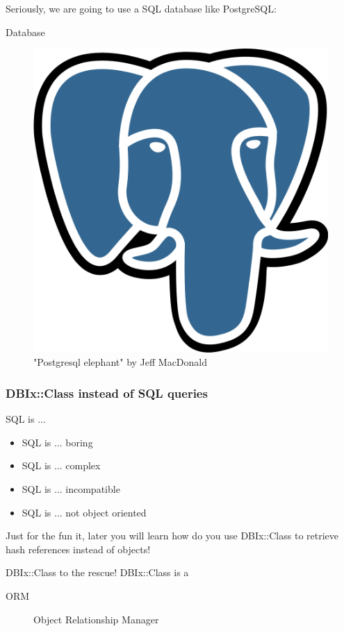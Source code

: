 Seriously, we are going to use a SQL database like
PostgreSQL:

\begin{frame}{Database}
\begin{figure}[!ht]
\centering
\includegraphics[width=0.4\linewidth]{img/postgresql.png}
\caption{"Postgresql elephant" by Jeff MacDonald}
\end{figure}
\end{frame}

\subsubsection{DBIx::Class instead of SQL queries}

\begin{frame}{SQL is ...}
\begin{itemize}
\item SQL is ... boring
\item SQL is ... complex
\item SQL is ... incompatible
\item SQL is ... not object oriented
\end{itemize}
\end{frame}


Just for the fun it, later you will learn how do you
use DBIx::Class to retrieve hash references instead of
objects!

\begin{frame}{DBIx::Class to the rescue!}
\centering
DBIx::Class is a
\begin{description}
\item[ORM] Object Relationship Manager
\end{description}
\end{frame}

